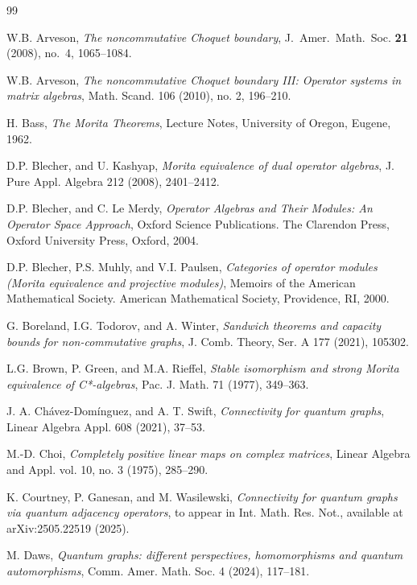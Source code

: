 \documentclass[11pt]{amsart}
\numberwithin{equation}{section}
\theoremstyle{plain}
\theoremstyle{definition}
\theoremstyle{remark}
\begin{document}
\begin{thebibliography}{99}

{\sc W.B. Arveson},
{\it The noncommutative Choquet boundary},
{\rm J.\ Amer.\ Math.\ Soc. \textbf{21} (2008), no.\ 4, 1065--1084.}

{\sc W.B. Arveson},
{\it The noncommutative Choquet boundary III: Operator systems in matrix algebras}, 
{\rm Math. Scand. 106 (2010), no. 2, 196–210.}

{\sc H. Bass}, 
{\it The Morita Theorems},
{\rm Lecture Notes, University of Oregon, Eugene, 1962.}

{\sc D.P. Blecher, and U. Kashyap}, 
{\it Morita equivalence of dual operator algebras},
{\rm J. Pure Appl. Algebra 212 (2008), 2401--2412.}

{\sc D.P. Blecher, and C. Le Merdy},
{\it Operator Algebras and Their Modules: An Operator Space Approach}, 
{\rm Oxford Science Publications. The Clarendon Press, Oxford University Press, Oxford, 2004.}

{\sc D.P. Blecher, P.S. Muhly, and V.I. Paulsen}, 
{\it Categories of operator modules (Morita equivalence and projective modules)}, 
{\rm Memoirs of the American Mathematical Society. American Mathematical Society, Providence, RI, 2000.}

{\sc G. Boreland, I.G. Todorov, and A. Winter},
{\it Sandwich theorems and capacity bounds for non-commutative graphs},
{\rm J. Comb. Theory, Ser. A 177 (2021), 105302}.

{\sc L.G. Brown, P. Green, and M.A. Rieffel}, 
{\it Stable isomorphism and strong Morita equivalence of C*-algebras},
{\rm Pac. J. Math. 71 (1977), 349--363}.

{\sc J. A. Ch\'avez-Dom\'inguez, and A. T. Swift},
{\it Connectivity for quantum graphs},
{\rm Linear Algebra Appl. 608 (2021), 37--53}.

{\sc M.-D. Choi},
{\it Completely positive linear maps on complex matrices},
{\rm Linear Algebra and Appl. vol. 10, no. 3 (1975), 285--290}.

{\sc K. Courtney, P. Ganesan, and M. Wasilewski},
{\it Connectivity for quantum graphs via quantum adjacency operators},
{\rm to appear in Int. Math. Res. Not., available at arXiv:2505.22519 (2025).}

{\sc M. Daws}, 
{\it Quantum graphs: different perspectives, homomorphisms and quantum automorphisms},
{\rm Comm. Amer. Math. Soc. 4 (2024), 117–181.}


\end{thebibliography}
\end{document}
